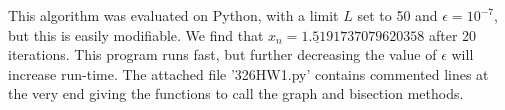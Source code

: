 \documentclass[12pt]{article}
\begin{document}
This algorithm was evaluated on Python, with a limit $L$ set to 50 and $\epsilon = 10^{-7}$, but this is easily modifiable. We find that $x_n = \underline{1.519}1737079620358$ after 20 iterations. This program runs fast, but further decreasing the value of $\epsilon$ will increase run-time. The attached file '326HW1.py' contains commented lines at the very end giving the functions to call the graph and bisection methods.
 
\end{document}
